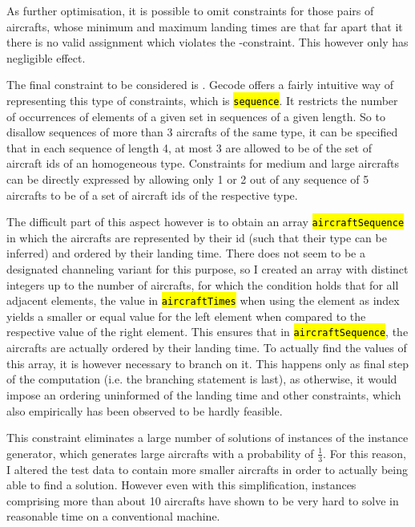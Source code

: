 \documentclass[,%
			paper=a4,%
			DIV11,
			liststotoc,
			bibtotoc,
			draft=false,%
			numbers=noendperiod
			]{scrartcl}
\newcommand{\ilc}[1]{\hl{\texttt{#1}}}
\newcommand{\mymarginnote}[1]{\marginnote{\footnotesize{#1}}}
\begin{document}
As further optimisation, it is possible to omit constraints for those pairs of aircrafts, whose minimum and maximum landing times are that far apart that it there is no valid assignment which violates the \CseqDel-constraint. This however only has negligible effect.

\mymarginnote{\CtypeSeq}
The final constraint to be considered is \CtypeSeq.
Gecode offers a fairly intuitive way of representing this type of constraints, which is \ilc{sequence}.
It restricts the number of occurrences of elements of a given set in sequences of a given length.
So to disallow sequences of more than 3 aircrafts of the same type, it can be specified that in each sequence of length 4, at most 3 are allowed to be of the set of aircraft ids of an homogeneous type.
Constraints for medium and large aircrafts can be directly expressed by allowing only 1 or 2 out of any sequence of 5 aircrafts to be of a set of aircraft ids of the respective type.

The difficult part of this aspect however is to obtain an array \ilc{aircraftSequence} in which the aircrafts are represented by their id (such that their type can be inferred) and ordered by their landing time. 
There does not seem to be a designated channeling variant for this purpose, so I created an array with distinct integers up to the number of aircrafts, for which the condition holds that for all adjacent elements, the value in \ilc{aircraftTimes} when using the element as index yields a smaller or equal value for the left element when compared to the respective value of the right element. This ensures that in \ilc{aircraftSequence}, the aircrafts are actually ordered by their landing time. 
To actually find the values of this array, it is however necessary to branch on it.
This happens only as final step of the computation (i.e. the branching statement is last), as otherwise, it would impose an ordering uninformed of the landing time and other constraints, which also empirically has been observed to be hardly feasible.

This constraint eliminates a large number of solutions of instances of the instance generator, which generates large aircrafts with a probability of $\frac{1}{3}$.
For this reason, I altered the test data to contain more smaller aircrafts in order to actually being able to find a solution.
However even with this simplification, instances comprising more than about 10 aircrafts have shown to be very hard to solve in reasonable time on a conventional machine.
\end{document}
